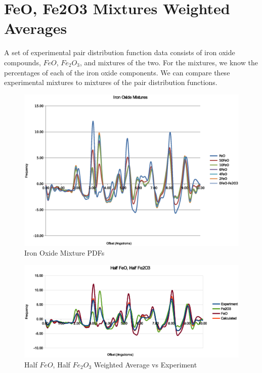 \documentclass[12pt,letterpaper]{article}
\begin{document}
\section{FeO, Fe2O3 Mixtures Weighted Averages}
A set of experimental pair distribution function data consists of iron oxide
compounds, $FeO$, $Fe_2O_3$, and mixtures of the two. For the mixtures, we know
the percentages of each of the iron oxide components. We can compare these
experimental mixtures to mixtures of the pair distribution functions.

\begin{figure}[ht]
  \begin{center}
    \includegraphics[scale=0.8]{figs/IronOxideMixturesPDFs.eps}
    \caption{Iron Oxide Mixture PDFs}
  \end{center}
\end{figure}

\begin{figure}[ht]
  \begin{center}
    \includegraphics[scale=0.8]{figs/50FeO_WeightedAverage.eps}
    \caption{Half $FeO$, Half $Fe_2O_3$ Weighted Average vs Experiment}
  \end{center}
\end{figure}
\clearpage
\end{document}
